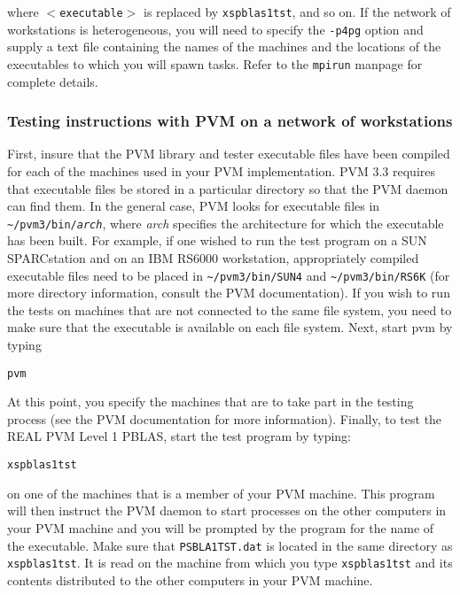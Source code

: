 \documentclass[11pt]{report}
\begin{document}
where {\tt $<$executable$>$} is replaced by {\tt xspblas1tst}, and so on.
If the network of workstations is heterogeneous, you will need to
specify the {\tt -p4pg} option and supply a text file containing the names
of the machines and the locations of the executables to which you
will spawn tasks.  Refer to the {\tt mpirun} manpage for complete details.

\subsubsection*{Testing instructions with PVM on a network of workstations}

First, insure that the PVM library and tester executable files have been
compiled for each of the machines used in your PVM implementation.  
PVM 3.3 requires that executable files be stored in a particular
directory so that the PVM daemon can find them.  In the general
case, PVM looks for executable files in {\tt \~{}/pvm3/bin/\em{}arch},
where {\em{}arch} specifies the architecture for which the executable
has been built.  For example, if one wished to run the test
program on a SUN SPARCstation and on an IBM RS6000 workstation,
appropriately compiled executable files need to be placed in
{\tt \~{}/pvm3/bin/SUN4} and {\tt{}\~{}/pvm3/bin/RS6K} (for
more directory information, consult the PVM documentation).
If you wish to run the tests on machines that are not connected to
the same file system, you need to make sure that the executable
is available on each file system.
Next, start pvm by typing

\begin{list}{}{}
\item{\tt pvm}
\end{list}

At this point, you specify the machines that are to take
part in the testing process (see the PVM documentation for more information).
Finally, to test the REAL PVM Level 1 PBLAS, start the test program
by typing:

\begin{list}{}{}
\item{\tt xspblas1tst}
\end{list}

on one of the machines that is a member of your PVM machine.
This program will then instruct the PVM daemon to start processes on the
other computers in your PVM machine and 
you will be prompted by the program for the name of the
executable.
Make sure that {\tt PSBLA1TST.dat} is located
in the same directory as {\tt xspblas1tst}.
It is read on the machine from which you type {\tt xspblas1tst} and
its contents distributed to the other computers in your PVM
machine.
\end{document}
